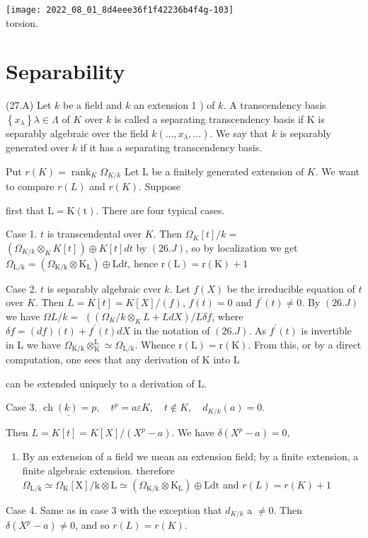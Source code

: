 \texttt{[image: 2022\_08\_01\_8d4eee36f1f42236b4f4g-103]}\\
torsion.

\section{Separability}
(27.A) Let $k$ be a field and $k$ an extension 1 ) of $k$. A transcendency basis $\left\{x_{\lambda}\right\} \lambda \in \Lambda$ of $K$ over $k$ is called a separating transcendency basis if $\mathrm{K}$ is separably algebraic over the field $k\left(\ldots, x_{\lambda}, \ldots\right)$. We say that $k$ is separably generated over $k$ if it has a separating transcendency basis.

Put $r(K)=\operatorname{rank}_{K} \Omega_{K / k}$ Let L be a finitely generated extension of $K$. We want to compare $r(L)$ and $r(K)$. Suppose

first that $\mathrm{L}=\mathrm{K}(\mathrm{t})$. There are four typical cases.

Case 1. $t$ is transcendental over $K$. Then $\Omega_{K}[t] / k=$ $\left(\Omega_{K / k} \otimes_{K} K[t]\right) \oplus K[t] d t$ by $(26 . J)$, so by localization we get $\Omega_{\mathrm{L} / \mathrm{k}}=\left(\Omega_{\mathrm{K} / \mathrm{k}} \otimes \mathrm{K}_{\mathrm{L}}\right) \oplus \mathrm{Ld} t$, hence $\mathrm{r}(\mathrm{L})=\mathrm{r}(\mathrm{K})+1$

Case 2. $t$ is separably algebraic cver $k$. Let $f(X)$ be the irreducible equation of $t$ over $K$. Then $L=K[t]=K[X] /(f)$, $f(t)=0$ and $f^{\prime}(t) \neq 0$. By $(26 . J)$ we have $\Omega L / k=$ $\left(\left(\Omega_{K} / k \otimes_{K} L+L d X\right) / L \delta f\right.$, where $\delta f=(d f)(t)+f^{\prime}(t) d X$ in the notation of $(26 . J)$. As $f^{\prime}(t)$ is invertible in L we have $\Omega_{\mathrm{K} / \mathrm{k}} \otimes_{\mathrm{K}}^{\mathrm{L}} \simeq \Omega_{\mathrm{L} / \mathrm{k}}$. Whence $\mathrm{r}(\mathrm{L})=\mathrm{r}(\mathrm{K})$. From this, or by a direct computation, one sees that any derivation of $\mathrm{K}$ into $\mathrm{L}$

can be extended uniquely to a derivation of L.

Case 3. $\underline{\operatorname{ch}(k)=p}, \quad t^{p}=a \varepsilon K, \quad t \notin K, \quad d_{K / k}(a)=0$.

Then $L=K[t]=K[X] /\left(X^{p}-a\right)$. We have $\delta\left(X^{p}-a\right)=0$,

\begin{enumerate}
  \item By an extension of a field we mean an extension field; by a finite extension, a finite algebraic extension. therefore $\Omega_{\mathrm{L} / \mathrm{k}} \simeq \Omega_{\mathrm{K}}[\mathrm{X}] / \mathrm{k} \otimes \mathrm{L} \simeq\left(\Omega_{\mathrm{K} / \mathrm{k}} \otimes \mathrm{K}_{\mathrm{L}}\right) \oplus \mathrm{Ldt}$ and $r(L)=r(K)+1$
\end{enumerate}
Case 4. Same as in case 3 with the exception that $d_{K / k}$ a $\neq 0$. Then $\delta\left(X^{p}-a\right) \neq 0$, and so $r(L)=r(K)$.

